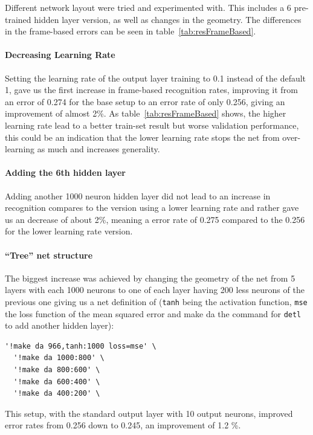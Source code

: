 Different network layout were tried and experimented with. This includes a 6 pre-trained hidden layer version, as well as changes in the geometry. The differences in the frame-based errors can be seen in table~\ref{tab:resFrameBased}. 

\paragraph{Decreasing Learning Rate} Setting the learning rate of the output layer training to 0.1 instead of the default 1, gave us the first increase in frame-based recognition rates, improving it from an error of 0.274 for the base setup to an error rate of only 0.256, giving an improvement of almost 2\%. As table~\ref{tab:resFrameBased} shows, the higher learning rate lead to a better train-set result but worse validation performance, this could be an indication that the lower learning rate stops the net from over-learning as much and increases generality.

\paragraph{Adding the 6th hidden layer} Adding another 1000 neuron hidden layer did not lead to an increase in recognition compares to the version using a lower learning rate and rather gave us an decrease of about 2\%, meaning a error rate of 0.275 compared to the 0.256 for the lower learning rate version.

\paragraph{``Tree'' net structure} The biggest increase was achieved by changing the geometry of the net from 5 layers with each 1000 neurons to one of each layer having 200 less neurons of the previous one giving us a net definition of (\texttt{tanh} being the activation function, \texttt{mse} the loss function of the mean squared error and make da the command for \texttt{detl} to add another hidden layer):

\begin{verbatim}'!make da 966,tanh:1000 loss=mse' \
  '!make da 1000:800' \
  '!make da 800:600' \
  '!make da 600:400' \
  '!make da 400:200' \
\end{verbatim}

This setup, with the standard output layer with 10 output neurons, improved error rates from 0.256 down to 0.245, an improvement of 1.2 \%.

